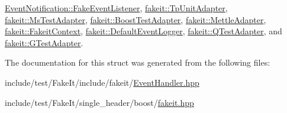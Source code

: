 \mbox{\hyperlink{classEventNotification_1_1FakeEventListener_a893aba2096af31fc87a179bf5adf9af4}{Event\+Notification\+::\+Fake\+Event\+Listener}}, \mbox{\hyperlink{classfakeit_1_1TpUnitAdapter_a49b90d34b82077f5904406b7954e55e9}{fakeit\+::\+Tp\+Unit\+Adapter}}, \mbox{\hyperlink{classfakeit_1_1MsTestAdapter_aff7f5f707e15b1dcd2d05743a026bbbd}{fakeit\+::\+Ms\+Test\+Adapter}}, \mbox{\hyperlink{structfakeit_1_1BoostTestAdapter_aef1bc4f059166c4e403bdb1d31b68fc5}{fakeit\+::\+Boost\+Test\+Adapter}}, \mbox{\hyperlink{structfakeit_1_1MettleAdapter_a1256c2d0349a01abb4f0e348c90fc59b}{fakeit\+::\+Mettle\+Adapter}}, \mbox{\hyperlink{structfakeit_1_1FakeitContext_a09e2d757900d3c49a1b17694fa0395f1}{fakeit\+::\+Fakeit\+Context}}, \mbox{\hyperlink{structfakeit_1_1DefaultEventLogger_ac2df9faf9057e440c0aa314f54ce6f1c}{fakeit\+::\+Default\+Event\+Logger}}, \mbox{\hyperlink{classfakeit_1_1QTestAdapter_a69748754023939bc9c5421bec4f9f44e}{fakeit\+::\+Q\+Test\+Adapter}}, and \mbox{\hyperlink{structfakeit_1_1GTestAdapter_af19fbc5b4c9dc6b9c6a8f94eb2b7e322}{fakeit\+::\+G\+Test\+Adapter}}.



The documentation for this struct was generated from the following files\+:\begin{DoxyCompactItemize}
\item 
include/test/\+Fake\+It/include/fakeit/\mbox{\hyperlink{EventHandler_8hpp}{Event\+Handler.\+hpp}}\item 
include/test/\+Fake\+It/single\+\_\+header/boost/\mbox{\hyperlink{single__header_2boost_2fakeit_8hpp}{fakeit.\+hpp}}\end{DoxyCompactItemize}
